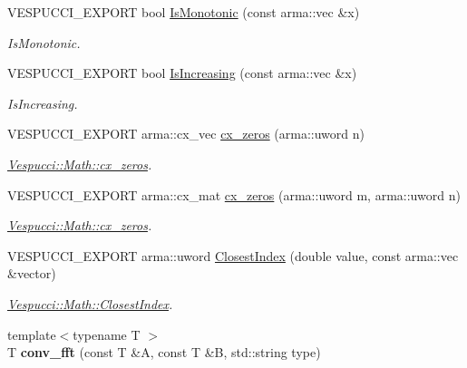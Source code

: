 \begin{DoxyCompactItemize}
V\+E\+S\+P\+U\+C\+C\+I\+\_\+\+E\+X\+P\+O\+RT bool \hyperlink{namespace_vespucci_1_1_math_a453b77159eb11d2c1aa7f7c458263c90}{Is\+Monotonic} (const arma\+::vec \&x)
\begin{DoxyCompactList}\small\item\em Is\+Monotonic. \end{DoxyCompactList}\item 
V\+E\+S\+P\+U\+C\+C\+I\+\_\+\+E\+X\+P\+O\+RT bool \hyperlink{namespace_vespucci_1_1_math_a33ffcd952bda70afdc4f9da9e00a57d8}{Is\+Increasing} (const arma\+::vec \&x)
\begin{DoxyCompactList}\small\item\em Is\+Increasing. \end{DoxyCompactList}\item 
V\+E\+S\+P\+U\+C\+C\+I\+\_\+\+E\+X\+P\+O\+RT arma\+::cx\+\_\+vec \hyperlink{namespace_vespucci_1_1_math_a618622cadc9bf2efd1a98c778d0af301}{cx\+\_\+zeros} (arma\+::uword n)
\begin{DoxyCompactList}\small\item\em \hyperlink{namespace_vespucci_1_1_math_a618622cadc9bf2efd1a98c778d0af301}{Vespucci\+::\+Math\+::cx\+\_\+zeros}. \end{DoxyCompactList}\item 
V\+E\+S\+P\+U\+C\+C\+I\+\_\+\+E\+X\+P\+O\+RT arma\+::cx\+\_\+mat \hyperlink{namespace_vespucci_1_1_math_af71f81417af505b1a076f559f85f6e90}{cx\+\_\+zeros} (arma\+::uword m, arma\+::uword n)
\begin{DoxyCompactList}\small\item\em \hyperlink{namespace_vespucci_1_1_math_a618622cadc9bf2efd1a98c778d0af301}{Vespucci\+::\+Math\+::cx\+\_\+zeros}. \end{DoxyCompactList}\item 
V\+E\+S\+P\+U\+C\+C\+I\+\_\+\+E\+X\+P\+O\+RT arma\+::uword \hyperlink{namespace_vespucci_1_1_math_a75dd493afb5cfbcfce2de327d3d88b7a}{Closest\+Index} (double value, const arma\+::vec \&vector)
\begin{DoxyCompactList}\small\item\em \hyperlink{namespace_vespucci_1_1_math_a75dd493afb5cfbcfce2de327d3d88b7a}{Vespucci\+::\+Math\+::\+Closest\+Index}. \end{DoxyCompactList}\item 
{\footnotesize template$<$typename T $>$ }\\T {\bfseries conv\+\_\+fft} (const T \&A, const T \&B, std\+::string type)\hypertarget{namespace_vespucci_1_1_math_a9c2b0dceba939de8417c1aa0382f9265}{}\label{namespace_vespucci_1_1_math_a9c2b0dceba939de8417c1aa0382f9265}


\end{DoxyCompactItemize}
